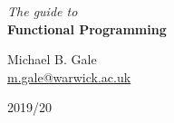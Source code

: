 
\begin{titlepage}
	\begin{center}
		
{\Huge \textit{The guide to}} \\[0.2cm]
{\Huge \textbf{Functional Programming}} \\[0.2cm]

\vfill

\scalebox{25.0}{$\lambda$}

\vfill 

{\LARGE Michael B. Gale} \\[0.1cm]
{\large \href{mailto:m.gale@warwick.ac.uk}{m.gale@warwick.ac.uk}}

\vspace{1cm}

{\Large 2019/20}
\end{center}
\end{titlepage}